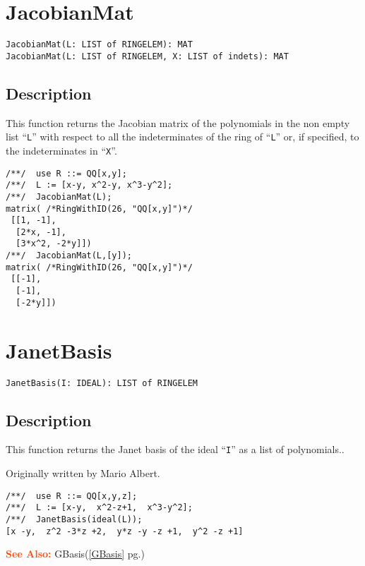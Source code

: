 \documentclass[a4paper]{mybook}
\newenvironment{command}{}{} %
\newcommand\SeeAlso{\par\textcolor{OrangeRed}{\textbf{\large See Also: }}}
\begin{document}
\section{JacobianMat}
\label{JacobianMat}
\begin{command} %


\begin{Verbatim}[label=syntax, rulecolor=\color{MidnightBlue},
frame=single]
JacobianMat(L: LIST of RINGELEM): MAT
JacobianMat(L: LIST of RINGELEM, X: LIST of indets): MAT
\end{Verbatim}


\subsection*{Description}

This function returns the Jacobian matrix of the polynomials in
the non empty list ``\verb&L&'' with respect to all the indeterminates
of the ring of ``\verb&L&'' or, if specified, to the indeterminates in ``\verb&X&''.
\begin{Verbatim}[label=example, rulecolor=\color{PineGreen}, frame=single]
/**/  use R ::= QQ[x,y];
/**/  L := [x-y, x^2-y, x^3-y^2];
/**/  JacobianMat(L);
matrix( /*RingWithID(26, "QQ[x,y]")*/
 [[1, -1],
  [2*x, -1],
  [3*x^2, -2*y]])
/**/  JacobianMat(L,[y]);
matrix( /*RingWithID(26, "QQ[x,y]")*/
 [[-1],
  [-1],
  [-2*y]])
\end{Verbatim}


\end{command} %

\section{JanetBasis}
\label{JanetBasis}
\begin{command} %


\begin{Verbatim}[label=syntax, rulecolor=\color{MidnightBlue},
frame=single]
JanetBasis(I: IDEAL): LIST of RINGELEM
\end{Verbatim}


\subsection*{Description}

This function returns the Janet basis of the ideal ``\verb&I&''
as a list of polynomials..
\par 
Originally written by Mario Albert.
\begin{Verbatim}[label=example, rulecolor=\color{PineGreen}, frame=single]
/**/  use R ::= QQ[x,y,z];
/**/  L := [x-y,  x^2-z+1,  x^3-y^2];
/**/  JanetBasis(ideal(L));
[x -y,  z^2 -3*z +2,  y*z -y -z +1,  y^2 -z +1]
\end{Verbatim}


\SeeAlso %
  GBasis(\ref{GBasis} pg.\pageref{GBasis})
\end{command} %
\end{document}
